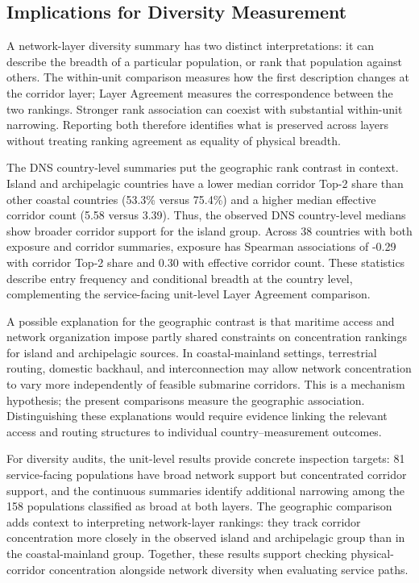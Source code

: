 \subsection{Implications for Diversity Measurement}
\label{subsec:resilience-implications}

A network-layer diversity summary has two distinct interpretations:
it can describe the breadth of a particular population, or rank that
population against others. The within-unit comparison measures how the
first description changes at the corridor layer; Layer Agreement measures
the correspondence between the two rankings. Stronger rank association
can coexist with substantial within-unit narrowing. Reporting both
therefore identifies what is preserved across layers without treating
ranking agreement as equality of physical breadth.

The DNS country-level summaries put the geographic rank contrast in context.
Island and archipelagic countries have a lower median corridor Top-2 share
than other coastal countries (53.3\% versus 75.4\%) and a higher median
effective corridor count (5.58 versus 3.39). Thus, the observed DNS
country-level medians show broader corridor support for the island group.
Across 38 countries with both exposure and corridor summaries, exposure
has Spearman associations of -0.29 with corridor Top-2 share and 0.30 with
effective corridor count. These statistics describe entry frequency and
conditional breadth at the country level, complementing the service-facing
unit-level Layer Agreement comparison.

A possible explanation for the geographic contrast is that maritime access
and network organization impose partly shared constraints on concentration
rankings for island and archipelagic sources. In coastal-mainland settings,
terrestrial routing, domestic backhaul, and interconnection may allow
network concentration to vary more independently of feasible submarine
corridors. This is a mechanism hypothesis; the present comparisons measure
the geographic association. Distinguishing these explanations would require
evidence linking the relevant access and routing structures to individual
country--measurement outcomes.

For diversity audits, the unit-level results provide concrete inspection
targets: 81 service-facing populations have broad network support but
concentrated corridor support, and the continuous summaries identify
additional narrowing among the 158 populations classified as broad at
both layers. The geographic comparison adds context to interpreting
network-layer rankings: they track corridor concentration more closely
in the observed island and archipelagic group than in the coastal-mainland
group. Together, these results support checking physical-corridor
concentration alongside network diversity when evaluating service paths.

